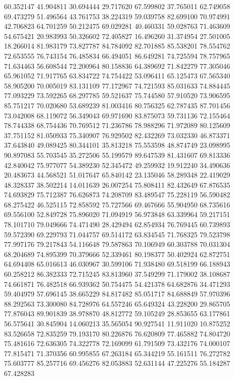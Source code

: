 60.352147
41.904811
30.694444
29.717620
67.599802
37.765011
62.749058
69.473279
51.496564
43.761753
38.224319
59.039758
82.699100
70.974991
42.706823
64.701259
50.212475
69.029281
40.460331
59.028763
71.463609
54.675421
20.983993
50.326602
72.405827
16.496260
31.374954
27.501005
18.266014
81.983179
73.827787
84.784092
82.701885
85.538201
78.554762
72.653555
76.743154
76.485834
66.494051
86.649281
74.725594
78.757965
71.634463
56.608544
72.200964
80.158836
64.389692
71.842279
77.305046
65.961052
71.917765
63.834722
74.754422
53.096411
65.125473
67.565340
58.905200
70.005019
83.131109
77.172967
74.721593
85.031633
74.884445
77.093229
73.592265
68.297785
59.521637
75.744580
57.910520
73.906595
85.751217
70.020680
53.689239
81.003416
80.756325
62.787435
87.701456
73.042008
68.119072
56.349043
69.971690
83.875073
59.731136
72.155464
78.744338
68.754436
70.769512
71.236786
78.988296
71.972089
80.125609
37.751152
81.050933
75.340907
76.929502
82.432269
73.032330
46.873371
37.643840
49.089425
80.344101
35.813218
75.553598
48.874749
23.098995
90.897083
55.703545
35.272506
55.199579
89.647539
81.431607
69.813336
42.840042
75.977077
54.389230
52.345472
49.259932
19.912240
34.490636
20.483673
44.568521
51.017647
65.840142
23.135046
58.289348
22.419029
48.328337
38.502214
14.011639
26.007254
75.808411
82.432649
67.876535
74.693829
75.712387
76.626873
74.208709
83.489547
75.228119
56.590482
68.275422
46.525115
72.858592
75.727566
69.467666
55.904950
68.735616
69.556100
52.849728
75.896020
71.094919
56.973848
63.339964
59.217151
78.101710
79.049666
74.471490
28.429494
62.854934
76.769445
60.739893
59.572390
69.229793
71.044757
69.514172
63.834545
71.768325
79.523798
77.997176
79.217843
54.116648
79.587863
70.106949
60.303788
70.031304
68.204689
74.895399
70.379666
52.339461
80.198377
50.402924
62.872751
64.694408
65.016613
46.030967
30.599106
71.938480
69.518199
66.188943
60.258212
86.382333
72.715245
83.813960
37.549299
71.179002
38.108687
74.661871
76.482518
66.939362
50.754475
54.421378
64.682876
34.471293
59.404979
57.696145
38.665229
84.817482
85.051717
84.688849
57.970396
88.292563
73.300080
84.728976
64.557246
65.649324
43.228200
29.865705
77.876043
89.901839
38.978870
48.812772
59.105249
28.853655
63.177861
56.575641
30.845904
14.060213
35.565054
90.927541
11.911020
10.875252
83.526658
72.835259
79.193170
80.226876
76.620809
77.465882
74.804720
75.481616
72.636305
74.322778
72.169099
61.791509
73.432176
74.000107
77.815471
71.370356
60.995855
67.263184
65.344219
55.161511
76.272782
75.603777
85.257716
69.456276
82.053883
52.631144
47.225276
55.184287
67.428283

